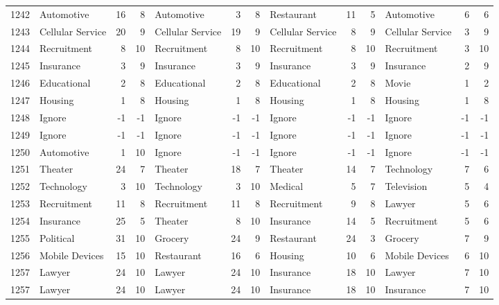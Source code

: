 \begin{figure}[htbp]
\begin{tabular}{rlrrlrrlrrlrr}
    1242  & Automotive & 16    & 8     & Automotive & 3     & 8     & Restaurant & 11    & 5     & Automotive & 6     & 6 \\
    1243  & Cellular Service & 20    & 9     & Cellular Service & 19    & 9     & Cellular Service & 8     & 9     & Cellular Service & 3     & 9 \\
    1244  & Recruitment & 8     & 10    & Recruitment & 8     & 10    & Recruitment & 8     & 10    & Recruitment & 3     & 10 \\
    1245  & Insurance & 3     & 9     & Insurance & 3     & 9     & Insurance & 3     & 9     & Insurance & 2     & 9 \\
    1246  & Educational & 2     & 8     & Educational & 2     & 8     & Educational & 2     & 8     & Movie & 1     & 2 \\
    1247  & Housing & 1     & 8     & Housing & 1     & 8     & Housing & 1     & 8     & Housing & 1     & 8 \\
    1248  & Ignore & -1    & -1    & Ignore & -1    & -1    & Ignore & -1    & -1    & Ignore & -1    & -1 \\
    1249  & Ignore & -1    & -1    & Ignore & -1    & -1    & Ignore & -1    & -1    & Ignore & -1    & -1 \\
    1250  & Automotive & 1     & 10    & Ignore & -1    & -1    & Ignore & -1    & -1    & Ignore & -1    & -1 \\
    1251  & Theater & 24    & 7     & Theater & 18    & 7     & Theater & 14    & 7     & Technology & 7     & 6 \\
    1252  & Technology & 3     & 10    & Technology & 3     & 10    & Medical & 5     & 7     & Television & 5     & 4 \\
    1253  & Recruitment & 11    & 8     & Recruitment & 11    & 8     & Recruitment & 9     & 8     & Lawyer & 5     & 6 \\
    1254  & Insurance & 25    & 5     & Theater & 8     & 10    & Insurance & 14    & 5     & Recruitment & 5     & 6 \\
    1255  & Political & 31    & 10    & Grocery & 24    & 9     & Restaurant & 24    & 3     & Grocery & 7     & 9 \\
    1256  & Mobile Devices & 15    & 10    & Restaurant & 16    & 6     & Housing & 10    & 6     & Mobile Devices & 6     & 10 \\
    1257  & Lawyer & 24    & 10    & Lawyer & 24    & 10    & Insurance & 18    & 10    & Lawyer & 7     & 10 \\
    1257  & Lawyer & 24    & 10    & Lawyer & 24    & 10    & Insurance & 18    & 10    & Insurance & 7     & 10 \\

\end{tabular}
\end{figure}
